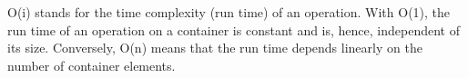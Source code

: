 O(i) stands for the time complexity (run time) of an operation. With O(1), the run time of an operation on a container is constant and is, hence, independent of its size. Conversely, O(n) means that the run time depends linearly on the number of container elements.